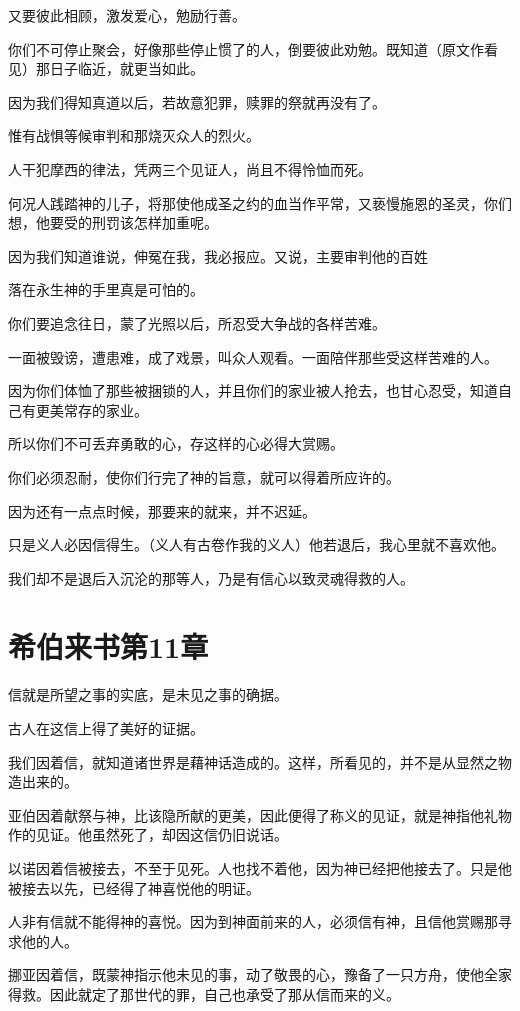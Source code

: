 \documentclass[12pt,oneside]{book}
\begin{document}
又要彼此相顾，激发爱心，勉励行善。

你们不可停止聚会，好像那些停止惯了的人，倒要彼此劝勉。既知道（原文作看见）那日子临近，就更当如此。

因为我们得知真道以后，若故意犯罪，赎罪的祭就再没有了。

惟有战惧等候审判和那烧灭众人的烈火。

人干犯摩西的律法，凭两三个见证人，尚且不得怜恤而死。

何况人践踏神的儿子，将那使他成圣之约的血当作平常，又亵慢施恩的圣灵，你们想，他要受的刑罚该怎样加重呢。

因为我们知道谁说，伸冤在我，我必报应。又说，主要审判他的百姓

落在永生神的手里真是可怕的。

你们要追念往日，蒙了光照以后，所忍受大争战的各样苦难。

一面被毁谤，遭患难，成了戏景，叫众人观看。一面陪伴那些受这样苦难的人。

因为你们体恤了那些被捆锁的人，并且你们的家业被人抢去，也甘心忍受，知道自己有更美常存的家业。

所以你们不可丢弃勇敢的心，存这样的心必得大赏赐。

你们必须忍耐，使你们行完了神的旨意，就可以得着所应许的。

因为还有一点点时候，那要来的就来，并不迟延。

只是义人必因信得生。（义人有古卷作我的义人）他若退后，我心里就不喜欢他。

我们却不是退后入沉沦的那等人，乃是有信心以致灵魂得救的人。

\chapter{希伯来书第11章}
信就是所望之事的实底，是未见之事的确据。

古人在这信上得了美好的证据。

我们因着信，就知道诸世界是藉神话造成的。这样，所看见的，并不是从显然之物造出来的。

亚伯因着献祭与神，比该隐所献的更美，因此便得了称义的见证，就是神指他礼物作的见证。他虽然死了，却因这信仍旧说话。

以诺因着信被接去，不至于见死。人也找不着他，因为神已经把他接去了。只是他被接去以先，已经得了神喜悦他的明证。

人非有信就不能得神的喜悦。因为到神面前来的人，必须信有神，且信他赏赐那寻求他的人。

挪亚因着信，既蒙神指示他未见的事，动了敬畏的心，豫备了一只方舟，使他全家得救。因此就定了那世代的罪，自己也承受了那从信而来的义。
\end{document}
